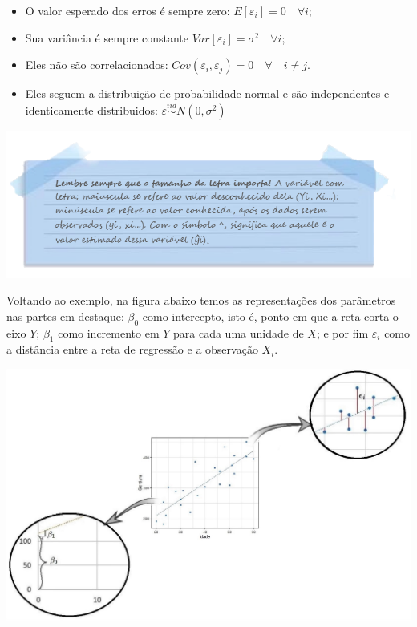 \documentclass[
]{article}
\providecommand{\tightlist}{%
  \setlength{\itemsep}{0pt}\setlength{\parskip}{0pt}}
\begin{document}
\begin{itemize}
\tightlist
\item
  O valor esperado dos erros é sempre zero:
  \(E[\varepsilon_i]=0 \quad\forall i\);\\
\item
  Sua variância é sempre constante
  \(Var[\varepsilon_i]=\sigma^2\quad\forall i\);\\
\item
  Eles não são correlacionados:
  \(Cov(\varepsilon_i, \varepsilon_j)=0 \quad \forall\quad i \ne j\).
\item
  Eles seguem a distribuição de probabilidade normal e são independentes
  e identicamente distribuidos:
  \(\varepsilon \stackrel{iid}{\sim} N(0, \sigma^2)\)
\end{itemize}

\includegraphics{images/note4.png}

Voltando ao exemplo, na figura abaixo temos as representações dos
parâmetros nas partes em destaque: \(\beta_0\) como intercepto, isto é,
ponto em que a reta corta o eixo \(Y\); \(\beta_1\) como incremento em
\(Y\) para cada uma unidade de \(X\); e por fim \(\varepsilon_i\) como a
distância entre a reta de regressão e a observação \(X_i\).

\includegraphics{images/denovo.jpeg}
\end{document}
